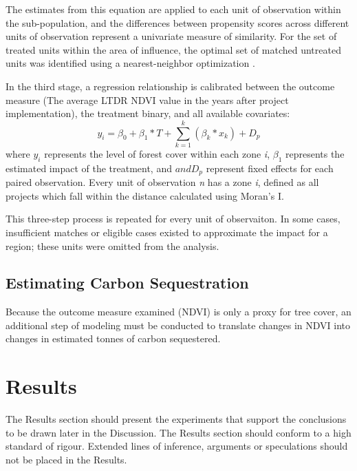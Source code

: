 \documentclass{article}\usepackage[]{graphicx}\usepackage[]{color}
\newenvironment{knitrout}{}{}  %
\begin{document}
\begin{knitrout}
The estimates from this equation are applied to each unit of observation within the sub-population, and the differences between propensity scores across different units of observation represent a univariate measure of similarity.  
For the set of treated units within the area of influence, the optimal set of matched untreated units was identified using a nearest-neighbor optimization \cite{ho_matchit:_2011}. \par
In the third stage, a regression relationship is calibrated between the outcome measure (The average LTDR NDVI value in the years after project implementation), the treatment binary, and all available covariates:
\begin{equation}
y_i = \beta_{0} + \beta_{1} * T + \sum_{k=1}^{k}(\beta_{k}*x_{k}) + D_{p}
\end{equation}
where \begin{math}y_{i}\end{math} represents the level of forest cover within each zone \textit{i}, \begin{math}\beta_{1}\end{math} represents the estimated impact of the treatment, and \begin{math}and D_{p}\end{math} represent fixed effects for each paired observation.
Every unit of observation \textit{n} has a zone \textit{i}, defined as all projects which fall within the distance calculated using Moran's I.
\par
This three-step process is repeated for every unit of observaiton.  
In some cases, insufficient matches or eligible cases existed to approximate the impact for a region; these units were omitted from the analysis.

\subsection{Estimating Carbon Sequestration}
Because the outcome measure examined (NDVI) is only a proxy for tree cover, an additional step of modeling must be conducted to translate changes in NDVI into changes in estimated tonnes of carbon sequestered.



\section{Results}
The Results section should present the experiments that support the conclusions to be drawn later in the Discussion. The Results section should conform to a high standard of rigour. Extended lines of inference, arguments or speculations should not be placed in the Results.


\end{knitrout}
\end{document}
